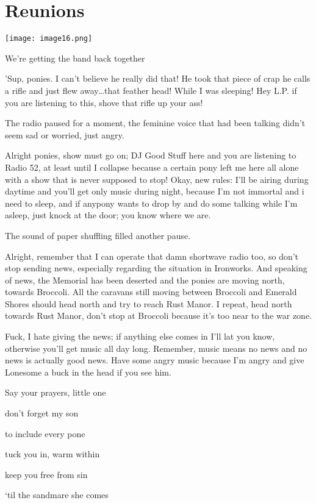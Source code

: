 \chapter{Reunions}

\texttt{[image: image16.png]}

\begin{intro}
    We're getting the band back together
\end{intro}

{\rt 'Sup, ponies. I can't believe he really did that! He took that piece of crap he calls a rifle and just flew away\dots that feather head! While I was sleeping! Hey L.P. if you are listening to this, shove that rifle up your ass!}

The radio paused for a moment, the feminine voice that had been talking didn't seem sad or worried, just angry.

{\rt Alright ponies, show must go on; DJ Good Stuff here and you are listening to Radio 52, at least until I collapse because a certain pony left me here all alone with a show that is never supposed to stop! Okay, new rules: I'll be airing during daytime and you'll get only music during night, because I'm not immortal and i need to sleep, and if anypony wants to drop by and do some talking while I'm asleep, just knock at the door; you know where we are.}

The sound of paper shuffling filled another pause.

{\rt Alright, remember that I can operate that damn shortwave radio too, so don't stop sending news, especially regarding the situation in Ironworks. And speaking of news, the Memorial has been deserted and the ponies are moving north, towards Broccoli. All the caravans still moving between Broccoli and Emerald Shores should head north and try to reach Rust Manor. I repeat, head north towards Rust Manor, don't stop at Broccoli because it's too near to the war zone.}

{\rt Fuck, I hate giving the news; if anything else comes in I'll lat you know, otherwise you'll get music all day long. Remember, music means no news and no news is actually good news. Have some angry music because I'm angry and give Lonesome a buck in the head if you see him.}


\begin{song}
    Say your prayers, little one

    don't forget my son

    to include every pone

    tuck you in, warm within

    keep you free from sin

    `til the sandmare she comes
\end{song}

